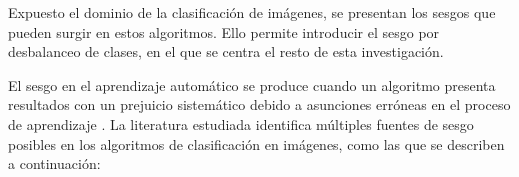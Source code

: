 Expuesto el dominio de la clasificación de imágenes, se presentan los sesgos que pueden surgir en estos algoritmos. Ello permite introducir el sesgo por desbalanceo de clases, en el que se centra el resto de esta investigación.

El sesgo en el aprendizaje automático se produce cuando un algoritmo presenta resultados con un prejuicio sistemático debido a asunciones erróneas en el proceso de aprendizaje \cite{vluymans2019dealing}. La literatura estudiada \cite{johnson2019survey,aka2021measuring,kim2019multiaccuracy,krishnan2020understanding,li2019learning} identifica
múltiples fuentes de sesgo posibles en los algoritmos de clasificación en imágenes, como las que se describen a continuación:

